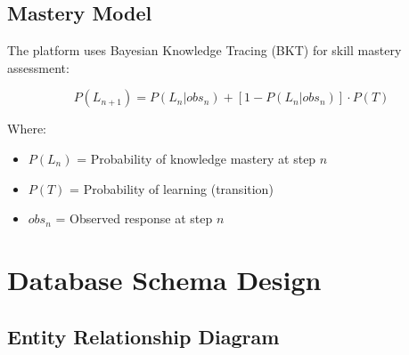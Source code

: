 \documentclass[12pt,a4paper]{article}
\begin{document}
\subsection{Mastery Model}

The platform uses Bayesian Knowledge Tracing (BKT) for skill mastery assessment:

\begin{equation}
P(L_{n+1}) = P(L_n|obs_n) + [1-P(L_n|obs_n)] \cdot P(T)
\end{equation}

Where:
\begin{itemize}
    \item $P(L_n)$ = Probability of knowledge mastery at step $n$
    \item $P(T)$ = Probability of learning (transition)
    \item $obs_n$ = Observed response at step $n$
\end{itemize}

\section{Database Schema Design}

\subsection{Entity Relationship Diagram}
\end{document}
